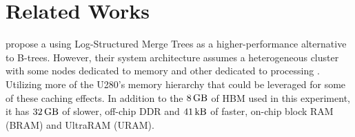 \section{Related Works}

\citeauthor{dlsm} propose a using Log-Structured Merge Trees as a higher-performance alternative to B-trees. However, their system architecture assumes a heterogeneous cluster with some nodes dedicated to memory and other dedicated to processing \cite{dlsm}. Utilizing more of the U280's memory hierarchy that could be leveraged for some of these caching effects. In addition to the $\SI{8}{\giga\byte}$ of HBM used in this experiment, it has $\SI{32}{\giga\byte}$ of slower, off-chip DDR and $\SI{41}{\kilo\byte}$ of faster, on-chip block RAM (BRAM) and UltraRAM (URAM).
